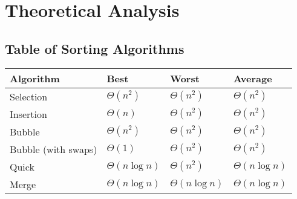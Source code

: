 \documentclass[letterpaper, 11pt]{article}
\begin{document}
\section{Theoretical Analysis}

\subsection{Table of Sorting Algorithms}
\begin{center}
\begin{tabular}{l | l l l}
  Algorithm & Best  & Worst  & Average  \\
  \hline
  Selection & \(\Theta(n^2)\) & \(\Theta(n^2)\) & \(\Theta(n^2)\) \\
  Insertion & \(\Theta(n)\) & \(\Theta(n^2)\) & \(\Theta(n^2)\) \\
  Bubble & \(\Theta(n^2)\) & \(\Theta(n^2)\) & \(\Theta(n^2)\) \\
  Bubble (with swaps) & \(\Theta(1)\) & \(\Theta(n^2)\) & \(\Theta(n^2)\) \\
  Quick & \(\Theta(n \log n)\) & \(\Theta(n^2)\) & \(\Theta(n\log n)\) \\
  Merge & \(\Theta(n \log n)\) & \(\Theta(n\log n)\) & \(\Theta(n\log n)\) \\
\end{tabular}
\end{center}
\end{document}
